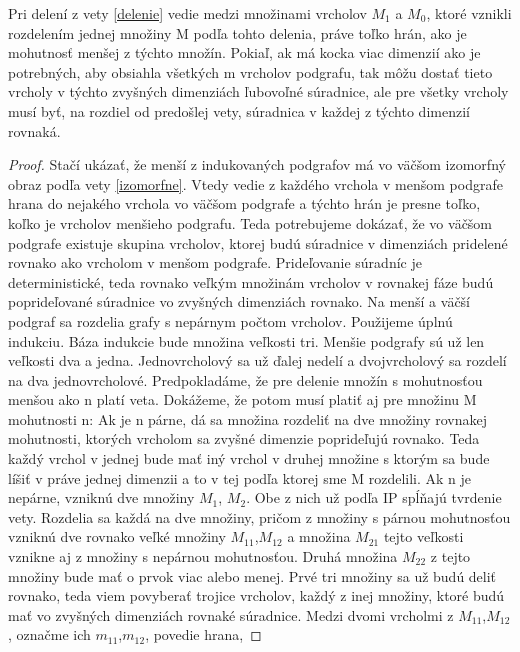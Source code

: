 \begin{veta}
\label{mensia}
Pri delení z vety \ref{delenie} vedie medzi množinami vrcholov $M_{1}$ a $M_{0}$,
ktoré vznikli rozdelením jednej množiny M podľa tohto delenia, práve toľko
hrán, ako je mohutnosť menšej z týchto množín. Pokiaľ, ak má kocka viac 
dimenzií ako
je potrebných, aby obsiahla všetkých m vrcholov podgrafu, tak môžu dostať
tieto vrcholy v týchto zvyšných dimenziách ľubovoľné súradnice, ale pre
všetky vrcholy musí byť, na rozdiel od predošlej vety, súradnica
 v každej z týchto dimenzií rovnaká.
\end{veta}

\begin{proof}
Stačí ukázať, že menší z indukovaných podgrafov má vo väčšom izomorfný obraz
podľa vety \ref{izomorfne}. Vtedy vedie z každého vrchola v menšom podgrafe
hrana do nejakého vrchola vo väčšom podgrafe a týchto hrán je presne toľko, koľko je
vrcholov menšieho podgrafu.
Teda potrebujeme dokázať, že vo väčšom podgrafe existuje skupina vrcholov,
ktorej budú súradnice v dimenziách pridelené rovnako ako vrcholom v menšom
podgrafe. Prideľovanie súradníc je deterministické, teda rovnako veľkým
množinám vrcholov v rovnakej fáze budú poprideľované súradnice vo zvyšných
dimenziách rovnako. Na menší a väčší podgraf sa rozdelia grafy s nepárnym
počtom vrcholov.
Použijeme úplnú indukciu. Báza indukcie bude množina veľkosti tri. Menšie
podgrafy sú už len veľkosti dva a jedna. Jednovrcholový sa už ďalej nedelí a
dvojvrcholový sa rozdelí na dva jednovrcholové.
Predpokladáme, že pre delenie množín s mohutnosťou menšou ako n platí veta.
Dokážeme, že potom musí platiť aj pre množinu M mohutnosti n: Ak je n párne,
dá sa množina rozdeliť na dve množiny rovnakej mohutnosti, ktorých vrcholom
sa zvyšné dimenzie poprideľujú rovnako. Teda každý vrchol v jednej bude mať
iný vrchol v druhej množine s ktorým sa bude líšiť v práve jednej dimenzii
a to v tej podľa ktorej sme M rozdelili.
Ak n je nepárne, vzniknú dve množiny $M_{1}$, $M_{2}$. Obe z nich už
podľa IP spĺňajú tvrdenie vety. Rozdelia sa každá na dve množiny, pričom z
množiny s párnou mohutnosťou vzniknú dve rovnako veľké množiny
$M_{11}$,$M_{12}$ a množina $M_{21}$
tejto veľkosti vznikne aj z množiny s nepárnou mohutnosťou. Druhá množina
$M_{22}$ z tejto množiny bude mať o prvok viac alebo menej.
Prvé tri množiny sa už budú deliť rovnako, teda viem povyberať trojice
vrcholov, každý z inej množiny, ktoré budú mať vo zvyšných dimenziách
rovnaké súradnice. Medzi dvomi vrcholmi z $M_{11}$,$M_{12}$, označme ich 
$m_{11}$,$m_{12}$,  povedie hrana,

\end{proof}
